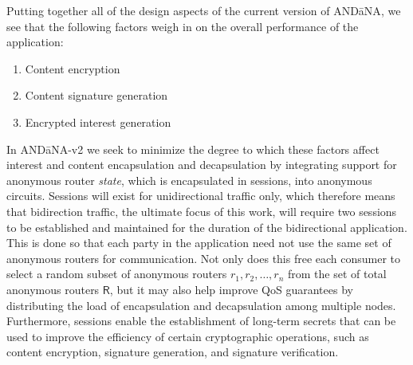 \documentclass[10pt]{article}
\begin{document}
Putting together all of the design aspects of the current version of {\sf AND\=aNA}, we see that the following factors weigh in on the overall performance of the application:
\begin{enumerate}
  \item Content encryption
  \item Content signature generation
  \item Encrypted interest generation
\end{enumerate} 
In {\sf AND\=aNA-v2} we seek to minimize the degree to which these factors affect interest and content encapsulation and decapsulation by integrating support for anonymous router \emph{state}, which is encapsulated in sessions, into anonymous circuits. Sessions will exist for unidirectional traffic only, which therefore means that bidirection traffic, the ultimate focus of this work, will require two sessions to be established and maintained for the duration of the bidirectional application. This is done so that each party in the application need not use the same set of anonymous routers for communication. Not only does this free each consumer to select a random subset of anonymous routers $r_1,r_2,\dots,r_n$ from the set of total anonymous routers $\mathsf{R}$, but it may also help improve QoS guarantees by distributing the load of encapsulation and decapsulation among multiple nodes. Furthermore, sessions enable the establishment of long-term secrets that can be used to improve the efficiency of certain cryptographic operations, such as content encryption, signature generation, and signature verification. 
\end{document}
